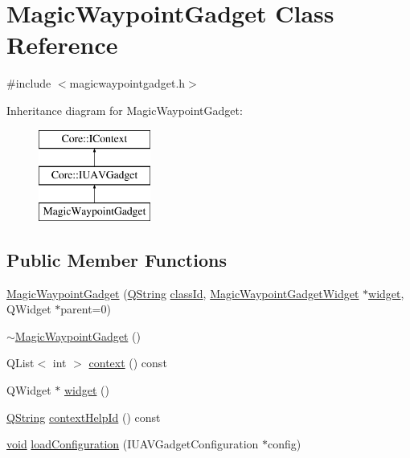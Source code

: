\hypertarget{class_magic_waypoint_gadget}{\section{\-Magic\-Waypoint\-Gadget \-Class \-Reference}
\label{class_magic_waypoint_gadget}
}


{\ttfamily \#include $<$magicwaypointgadget.\-h$>$}

\-Inheritance diagram for \-Magic\-Waypoint\-Gadget\-:\begin{figure}[H]
\begin{center}
\leavevmode
\includegraphics[height=3.000000cm]{class_magic_waypoint_gadget}
\end{center}
\end{figure}
\subsection*{\-Public \-Member \-Functions}
\begin{DoxyCompactItemize}
\item 
\hyperlink{group___g_c_s_control_gadget_plugin_ga7c890e89a9d75c8e6498c9b894ba70ce}{\-Magic\-Waypoint\-Gadget} (\hyperlink{group___u_a_v_objects_plugin_gab9d252f49c333c94a72f97ce3105a32d}{\-Q\-String} \hyperlink{group___core_plugin_ga3878fde66a57220608960bcc3fbeef2c}{class\-Id}, \hyperlink{class_magic_waypoint_gadget_widget}{\-Magic\-Waypoint\-Gadget\-Widget} $\ast$\hyperlink{group___g_c_s_control_gadget_plugin_ga361c7a72cf1a95a2cf36f858d5b9bee5}{widget}, \-Q\-Widget $\ast$parent=0)
\item 
\hyperlink{group___g_c_s_control_gadget_plugin_ga7caf437fa3df4fc4c30bb259b16d5b89}{$\sim$\-Magic\-Waypoint\-Gadget} ()
\item 
\-Q\-List$<$ int $>$ \hyperlink{group___g_c_s_control_gadget_plugin_ga7521519a1bb7dd420c9e4d2f1bf49a2f}{context} () const 
\item 
\-Q\-Widget $\ast$ \hyperlink{group___g_c_s_control_gadget_plugin_ga361c7a72cf1a95a2cf36f858d5b9bee5}{widget} ()
\item 
\hyperlink{group___u_a_v_objects_plugin_gab9d252f49c333c94a72f97ce3105a32d}{\-Q\-String} \hyperlink{group___g_c_s_control_gadget_plugin_gab2c239e4a2ee9921f9c9c0c79f769c3e}{context\-Help\-Id} () const 
\item 
\hyperlink{group___u_a_v_objects_plugin_ga444cf2ff3f0ecbe028adce838d373f5c}{void} \hyperlink{group___g_c_s_control_gadget_plugin_ga163d222d9f3681fe93e07da2800e97ae}{load\-Configuration} (\-I\-U\-A\-V\-Gadget\-Configuration $\ast$config)
\end{DoxyCompactItemize}


